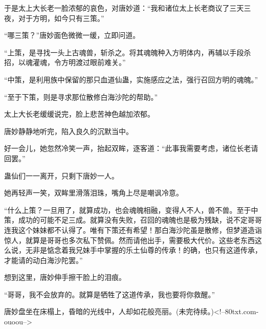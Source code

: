 \begin{this_body}
于是太上大长老一脸浓郁的哀色，对唐妙道：“我和诸位太上长老商议了三天三夜，对于方明，如今只有三策。”

“哪三策？”唐妙面色微微一缓，立即问道。

“上策，是寻找一头上古魂兽，斩杀之。将其魂魄种入方明体内，再辅以手段杀招，以魂灌魂，令方明渡过眼前难关。”

“中策，是利用族中保留的那只血道仙蛊，实施感应之法，强行召回方明的魂魄。”

“至于下策，则是寻求那位散修白海沙陀的帮助。”

太上大长老缓缓说完，脸上悲苦神色越加浓郁。

唐妙静静地听完，陷入良久的沉默当中。

好一会儿，她忽然冷笑一声，抬起双眸，逐客道：“此事我需要考虑，诸位长老请回罢。”

蛊仙们一一离开，只剩下唐妙一人。

她再轻声一笑，双眸里滑落泪珠，嘴角上尽是嘲讽冷意。

“什么上策？一旦用了，就算成功，也会魂魄相融，变得人不人，兽不兽。至于中策，成功的可能不足三成。就算没有失败，召回的魂魄也是极为残缺，说不定哥哥连我这个妹妹都不认得了。唯有下策还有希望！那白海沙陀虽是散修，但梦道造诣惊人，就算是哥哥也多次私下赞佩。然而请他出手，需要极大代价。这些老东西这么说，无非是惦念着我兄妹手中掌握的乐土仙尊的传承！的确，也只有这道传承，才能请的动白海沙陀罢。”

想到这里，唐妙伸手擦干脸上的泪痕。

“哥哥，我不会放弃的。就算是牺牲了这道传承，我也要将你救醒。”

唐妙盘坐在床榻上，昏暗的光线中，人却如花般亮丽。(未完待续。)<!--80txt.com-ouoou-->

\end{this_body}

